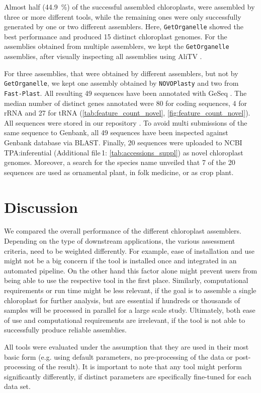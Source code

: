 \documentclass{bmcart}
\newcommand{\formatprogramnames}[1]{\texttt{#1}}
\newcommand{\fp}{\formatprogramnames{Fast-Plast}}
\newcommand{\np}{\formatprogramnames{NOVOPlasty}}
\newcommand{\go}{\formatprogramnames{GetOrganelle}}
\newcommand{\zenodorepo}{\cite{zenodorepo}}
\newcommand{\crefsupp}[1]{Additional file\,1: \cref{#1}}
\begin{document}
Almost half (\SI{44.9}{\percent}) of the successful assembled chloroplasts, were assembled by three or more different tools, while the remaining ones were only successfully generated by one or two different assemblers. 
Here, \go{} showed the best performance and produced 15 distinct chloroplast genomes. 
For the assemblies obtained from multiple assemblers, we kept the \go{} assemblies,
after visually inspecting all assemblies using AliTV \cite{alitv}.

For three assemblies, that were obtained by different assemblers, but not by \go{}, we kept one assembly obtained by \np{} and two from \fp{}.
All resulting \num{49} sequences have been annotated with GeSeq \cite{geseq}. 
The median number of distinct genes annotated were 80 for coding sequences, 4 for rRNA and 27 for tRNA (\cref{tab:feature_count_novel}, \cref{fig:feature_count_novel}). 
All sequences were stored in our repository \zenodorepo{}.
To avoid multi submissions of the same sequence to Genbank, all \num{49} sequences have been inspected against Genbank database via BLAST.
Finally, \num{20} sequences were uploaded to NCBI TPA:inferential (\crefsupp{tab:accessions_suppl}) as novel chloroplast genomes.
Moreover, a search for the species name unveiled that \num{7} of the \num{20} sequences are used as ornamental plant, in folk medicine, or as crop plant.

\section*{Discussion}
We compared the overall performance of the different chloroplast assemblers.
Depending on the type of downstream applications, the various assessment criteria, need to be weighted differently.
For example, ease of installation and use might not be a big concern if the tool is installed once and integrated in an automated pipeline.
On the other hand this factor alone might prevent users from being able to use the respective tool in the first place.
Similarly, computational requirements or run time might be less relevant, if the goal is to assemble a single chloroplast for further analysis, but are essential if hundreds or thousands of samples will be processed in parallel for a large scale study.
Ultimately, both ease of use and computational requirements are irrelevant, if the tool is not able to successfully produce reliable assemblies.

All tools were evaluated under the assumption that they are used in their most basic form (e.g. using default parameters, no pre-processing of the data or post-processing of the result).
It is important to note that any tool might perform significantly differently, if distinct parameters are specifically fine-tuned for each data set.
\end{document}
